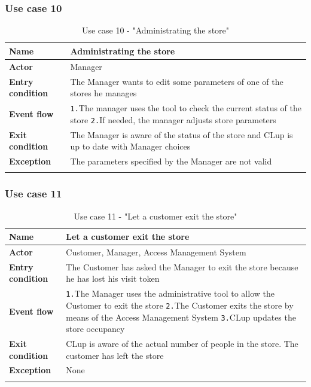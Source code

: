 \documentclass[a4paper,oneside,11pt]{book}   %
\begin{document}
    \subsubsection{Use case 10}
    \begin{longtable}[c] { |>{\bfseries{}}C{0.25\textwidth}|V{0.55\textwidth}| }
        \hline
        Name            & Administrating the store \\ \hline
        Actor           & Manager \\ \hline
        Entry condition & The Manager wants to edit some parameters of one of the stores he manages \\ \hline
        Event flow      & 
        \texttt{1.}The manager uses the tool to check the current status of the store \newline
        \texttt{2.}If needed, the manager adjusts store parameters \newline \\ \hline
        Exit condition  & The Manager is aware of the status of the store and CLup is up to date with Manager choices \\ \hline
        Exception       & The parameters specified by the Manager are not valid \\
        \hline
    \caption{Use case 10 - "Administrating the store"}
    \label{table:use_case_10}
    \end{longtable}
    
    \subsubsection{Use case 11}
    \begin{longtable}[c] { |>{\bfseries{}}C{0.25\textwidth}|V{0.55\textwidth}| }
        \hline
        Name            & Let a customer exit the store \\ \hline
        Actor           & Customer, Manager, Access Management System \\ \hline
        Entry condition & The Customer has asked the Manager to exit the store because he has lost his visit token \\ \hline
        Event flow      & 
        \texttt{1.}The Manager uses the administrative tool to allow the Customer to exit the store \newline
        \texttt{2.}The Customer exits the store by means of the Access Management System \newline
        \texttt{3.}CLup updates the store occupancy \\ \hline
        Exit condition  & CLup is aware of the actual number of people in the store. The customer has left the store \\ \hline
        Exception       & None \\
        \hline
    \caption{Use case 11 - "Let a customer exit the store"}
    \label{table:use_case_11}
    \end{longtable}
    
\end{document}
